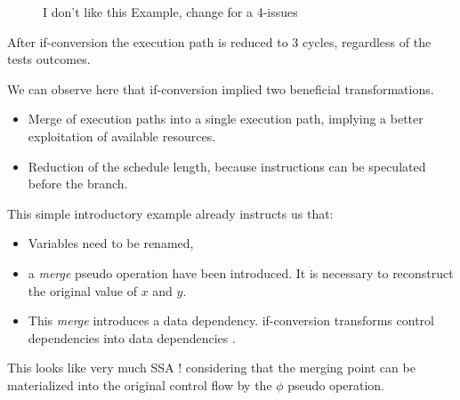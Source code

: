 \begin{figure}
\caption{I don't like this Example, change for a 4-issues}
\label{fig:example1}
\end{figure}

After if-conversion the execution path is reduced to 3 cycles, regardless of the tests outcomes. 

We can observe here that if-conversion implied two beneficial transformations.
\begin{itemize}
\item  Merge of execution paths into a single execution path, implying a  better exploitation of available resources.  
\item Reduction of the schedule length, because instructions can be speculated before the branch.
\end{itemize}

This simple introductory example already instructs us that:

\begin{itemize}
\item Variables need to be renamed, 
\item a \textit{merge} pseudo operation have been introduced. It is necessary to reconstruct the original value of $x$ and $y$.
\item This \textit{merge} introduces a data dependency. if-conversion transforms control dependencies into data dependencies \cite{Allen:1983:CCD:567067.567085}. 
\end{itemize}
This looks like very much SSA ! considering that the merging point can be materialized into the original control flow by the $\phi$ pseudo operation.

